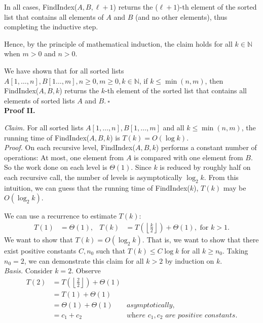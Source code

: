 \begin{solution}
\begin{itemize}
In all cases, {\sc FindIndex}($A,B,\ell+1$) returns the ($\ell+1$)-th element of the sorted list that contains all elements of $A$ and $B$ (and no other elements), thus completing the inductive step.

Hence, by the principle of mathematical induction, the claim holds for all $k\in\mathbb{N}$ when $m>0$ and $n>0$.
\end{itemize}

\noindent We have shown that for all sorted lists $A[1,\dots,n],B[1\dots,m],n\geq 0,m\geq 0,k\in\mathbb{N}$, if $k\leq\min(n,m)$, then {\sc FindIndex}($A,B,k$) returns the $k$-th element of the sorted list that contains all elements of sorted lists $A$ and $B$.$~\square$\\

\noindent\textbf{Proof II.}

\noindent\textit{Claim. }For all sorted lists $A[1,\dots,n],B[1,\dots,m]$ and all $k\leq\min(n,m)$, the running time of {\sc FindIndex}($A,B,k$) is $T(k)=O(\log{k})$.\\

\noindent\textit{Proof. }On each recursive level, {\sc FindIndex}($A,B,k$) performs a constant number of operations: At most, one element from $A$ is compared with one element from $B$. So the work done on each level is $\Theta(1)$. Since $k$ is reduced by roughly half on each recursive call, the number of levels is asymptotically $\log_2k$. From this intuition, we can guess that the running time of {\sc FindIndex}($k$), $T(k)$ may be $O(\log_2k)$. 

We can use a recurrence to estimate $T(k)$:
\begin{align*}
T(1)&=\Theta(1),&
T(k)&=T\left(\left\lfloor\frac{k}{2}\right\rfloor\right)+\Theta(1),
\text{ for }k>1.
\end{align*}
We want to show that $T(k)=O(\log_2k)$. That is, we want to show that there exist positive constants $C,n_0$ such that $T(k)\leq C\log{k}$ for all $k\geq n_0$. Taking $n_0=2$, we can demonstrate this claim for all $k>2$ by induction on $k$.\\

\noindent\textit{Basis. }Consider $k=2$. Observe
\begin{align*}
T(2)&=T\left(\left\lfloor\frac{2}{2}\right\rfloor\right)+\Theta(1)\\
&=T(1)+\Theta(1)\\
&=\Theta(1)+\Theta(1)&\textit{asymptotically,}\\
&=c_1+c_2&\textit{where $c_1,c_2$ are positive constants.}
\end{align*}


\end{solution}
